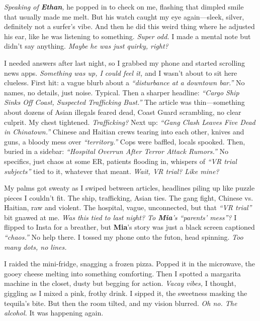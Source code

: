 \documentclass{article}
\begin{document}
\textit{Speaking of \textbf{Ethan},} he popped in to check on me, flashing that dimpled smile that usually made me melt. But his watch caught my eye again—sleek, silver, definitely not a surfer’s vibe. And then he did this weird thing where he adjusted his ear, like he was listening to something. \textit{Super odd.} I made a mental note but didn’t say anything. \textit{Maybe he was just quirky, right?}

I needed answers after last night, so I grabbed my phone and started scrolling news apps. \textit{Something was up, I could feel it,} and I wasn’t about to sit here clueless. First hit: a vague blurb about a \textit{“disturbance at a downtown bar.”} No names, no details, just noise. Typical. Then a sharper headline: \textit{“Cargo Ship Sinks Off Coast, Suspected Trafficking Bust.”} The article was thin—something about dozens of Asian illegals feared dead, Coast Guard scrambling, no clear culprit. My chest tightened. \textit{Trafficking?} Next up: \textit{“Gang Clash Leaves Five Dead in Chinatown.”} Chinese and Haitian crews tearing into each other, knives and guns, a bloody mess over \textit{“territory.”} Cops were baffled, locals spooked. Then, buried in a sidebar: \textit{“Hospital Overrun After Terror Attack Rumors.”} No specifics, just chaos at some ER, patients flooding in, whispers of \textit{“VR trial subjects”} tied to it, whatever that meant. \textit{Wait, VR trial? Like mine?}

My palms got sweaty as I swiped between articles, headlines piling up like puzzle pieces I couldn’t fit. The ship, trafficking, Asian ties. The gang fight, Chinese vs. Haitian, raw and violent. The hospital, vague, unconnected, but that \textit{“VR trial”} bit gnawed at me. \textit{Was this tied to last night? To \textbf{Mia}’s “parents’ mess”?} I flipped to Insta for a breather, but \textbf{Mia}’s story was just a black screen captioned \textit{“chaos.”} No help there. I tossed my phone onto the futon, head spinning. \textit{Too many dots, no lines.}

I raided the mini-fridge, snagging a frozen pizza. Popped it in the microwave, the gooey cheese melting into something comforting. Then I spotted a margarita machine in the closet, dusty but begging for action. \textit{Vacay vibes,} I thought, giggling as I mixed a pink, frothy drink. I sipped it, the sweetness masking the tequila’s bite. But then the room tilted, and my vision blurred. \textit{Oh no. The alcohol.} It was happening again.
\end{document}
